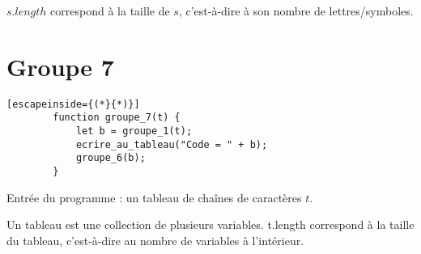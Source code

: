 \documentclass{article}
\begin{document}
	\vspace{1em}
	\noindent $s.length$ correspond à la taille de $s$, c'est-à-dire à son nombre de lettres/symboles.
	
	\newpage
	\section*{Groupe 7}
	\begin{lstlisting}[escapeinside={(*}{*)}]
		function groupe_7(t) {
			let b = groupe_1(t);	
			ecrire_au_tableau("Code = " + b);
			groupe_6(b);
		}
	\end{lstlisting}
	Entrée du programme : un tableau de chaînes de caractères $t$.
	
	\vspace{1em}
	\noindent Un tableau est une collection de plusieurs variables. t.length correspond à la taille du tableau, c'est-à-dire au nombre de variables à l'intérieur.
\end{document}
